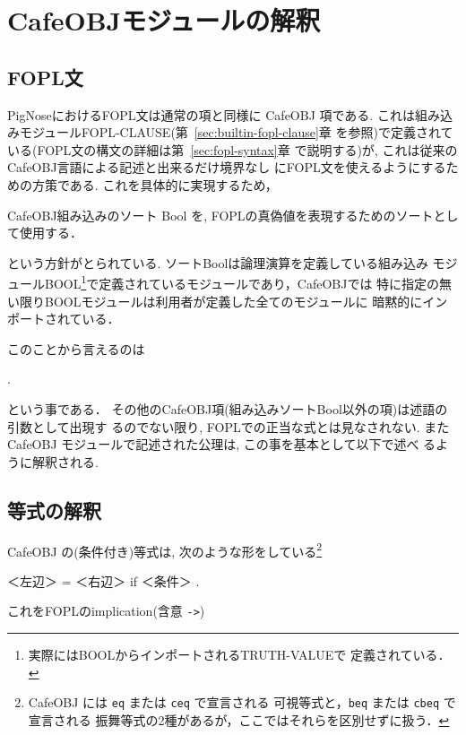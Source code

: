 \section{CafeOBJモジュールの解釈}

\subsection{FOPL文}
PigNoseにおけるFOPL文は通常の項と同様に CafeOBJ 項である. 
これは組み込みモジュールFOPL-CLAUSE(第~\ref{sec:builtin-fopl-clause}章
を参照)で定義されている(FOPL文の構文の詳細は第~\ref{sec:fopl-syntax}章
で説明する)が, これは従来のCafeOBJ言語による記述と出来るだけ境界なし
にFOPL文を使えるようにするための方策である.  
これを具体的に実現するため，
\begin{framed}
CafeOBJ組み込みのソート Bool を, FOPLの真偽値を表現するためのソートとし
て使用する．
\end{framed}
という方針がとられている. ソートBoolは論理演算を定義している組み込み
モジュールBOOL\footnote{実際にはBOOLからインポートされるTRUTH-VALUEで
定義されている．}で定義されているモジュールであり，CafeOBJでは
特に指定の無い限りBOOLモジュールは利用者が定義した全てのモジュールに
暗黙的にインポートされている．

このことから言えるのは
\begin{center}
.
\end{center}
という事である．
その他のCafeOBJ項(組み込みソートBool以外の項)は述語の引数として出現す
るのでない限り, FOPLでの正当な式とは見なされない.
またCafeOBJ モジュールで記述された公理は, この事を基本として以下で述べ
るように解釈される.

\subsection{等式の解釈}
CafeOBJ の(条件付き)等式は, 次のような形をしている\footnote{%
CafeOBJ には \texttt{eq} または \texttt{ceq} で宣言される
可視等式と，\texttt{beq} または \texttt{cbeq} で宣言される
振舞等式の2種があるが，ここではそれらを区別せずに扱う．}

\begin{vvtm}
\begin{simplev}
        ＜左辺＞ = ＜右辺＞ if ＜条件＞ .
\end{simplev}
\end{vvtm}

これをFOPLのimplication(含意 \verb|->|)


